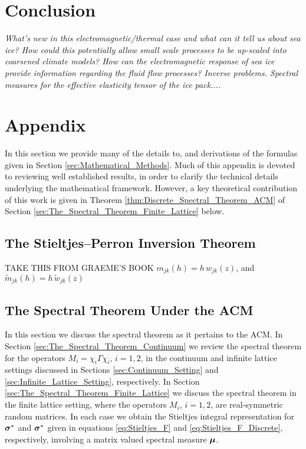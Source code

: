 \documentclass{cmslatex}
\renewcommand{\theequation}{\arabic{section}.\arabic{equation}}
\newcommand\bsig{\mbox{\boldmath${\sigma}$}}
\newcommand\bmu{\mbox{\boldmath${\mu}$}}
\begin{document}
\section{Conclusion}
{\it What's new in this electromagnetic/thermal case and what can it tell us about sea ice? How could this potentially allow small scale processes to be up-scaled into coarsened climate models? How can the electromagnetic response of sea ice provide information regarding the fluid flow processes? Inverse problems. Spectral measures for the effective elasticity tensor of the ice pack....}

\newpage

  \setcounter{equation}{1}  %
  \setcounter{section}{0}  %
  \renewcommand{\theequation}{A-\arabic{equation}}
\renewcommand{\thesection}{A-\arabic{section}}
\section{Appendix} \label{sec:Appendix}


%
 
%
In this section we provide many of the details to, and derivations of
the formulas given in Section \ref{sec:Mathematical_Methods}. Much of this
appendix is devoted to reviewing well established results, in order to
clarify the technical details underlying the mathematical
framework. However, a key theoretical contribution of this work is
given in Theorem \ref{thm:Discrete_Spectral_Theorem_ACM} of Section
\ref{sec:The_Spectral_Theorem_Finite_Lattice} below.   









\subsection{The Stieltjes--Perron Inversion Theorem}
\label{sec:Stieltjes-Perron}
TAKE THIS FROM GRAEME'S BOOK
$m_{jk}(h)=h\,w_{jk}(z)$, and
$\tilde{m}_{jk}(h)=h\,\tilde{w}_{jk}(z)$

\subsection{The Spectral Theorem Under the ACM}
\label{sec:The_Spectral_Theorem}
%
In this section we discuss the spectral theorem
\cite{Reed-1980,Stone:64} as it pertains to the ACM. In Section
\ref{sec:The_Spectral_Theorem_Continuum} we review the spectral
theorem for the operators  $M_i=\chi_i\Gamma\chi_i$, $i=1,2$, in the continuum
and infinite lattice settings discussed in Sections
\ref{sec:Continuum_Setting} and \ref{sec:Infinite_Lattice_Setting},
respectively.  In Section
\ref{sec:The_Spectral_Theorem_Finite_Lattice} we discuss the spectral
theorem in the finite lattice setting, where the operators $M_i$,
$i=1,2$, are real-symmetric random matrices. In each case we obtain
the Stieltjes integral representation for $\bsig^*$ and $\bsig^*$
given in equations \eqref{eq:Stieltjes_F} and
\eqref{eq:Stieltjes_F_Discrete}, respectively, involving a matrix
valued spectral measure $\bmu$.     
%
\end{document}
